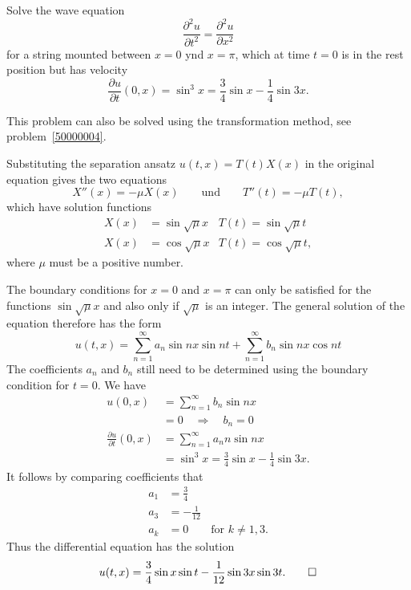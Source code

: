 Solve the wave equation
\[
\frac{\partial^2 u}{\partial t^2}=\frac{\partial^2 u}{\partial x^2}
\]
for a string mounted between $x=0$ ynd $x=\pi$, which at time $t=0$
is in the rest position but has velocity
\[
\frac{\partial u}{\partial t}(0, x)
=
\sin^3 x=\frac34\sin x-\frac14\sin 3x.
\]

\begin{hinweis}
This problem can also be solved using the transformation method, see
problem~\ref{50000004}.
\end{hinweis}

\begin{loesung}
Substituting the separation ansatz 
$u(t,x)=T(t)X(x)$ in the original equation gives the two equations
\[
X''(x)=-\mu X(x)\qquad\text{und}\qquad T''(t)=-\mu T(t),
\]
which have solution functions
\begin{align*}
X(x)&=\sin\sqrt{\mu}x & T(t)=\sin\sqrt{\mu}t\\
X(x)&=\cos\sqrt{\mu}x & T(t)=\cos\sqrt{\mu}t,
\end{align*}
where $\mu$ must be a positive number.

The boundary conditions for $x=0$ and $x=\pi$ can only be satisfied for
the functions $\sin\sqrt{\mu}x$ and also only if $\sqrt{\mu}$ is an
integer.
The general solution of the equation therefore has the form
\[
u(t,x)
=
\sum_{n=1}^\infty a_n\sin nx \sin nt+\sum_{n=1}^\infty b_n\sin nx\cos nt
\]
The coefficients $a_n$ and $b_n$ still need to be determined using the
boundary condition for $t=0$.
We have
\begin{align*}
u(0,x)&=
\sum_{n=1}^\infty b_n\sin nx
\\
&=0\quad\Rightarrow\quad b_n=0
\\
\frac{\partial u}{\partial t}(0,x)
&=
\sum_{n=1}^\infty a_nn\sin nx
\\
&=
\sin^3 x=\frac34\sin x-\frac14\sin 3x.
\end{align*}
It follows by comparing coefficients that
\begin{align*}
a_1&=\frac34\\
a_3&=-\frac{1}{12}\\
a_k&=0\qquad\text{for $k\ne 1,3$.}
\end{align*}
Thus the differential equation has the solution
\[
u(t,x)
= \frac34\sin x \sin t -\frac1{12}\sin 3x \sin 3t.
\qedhere
\]
\end{loesung}
